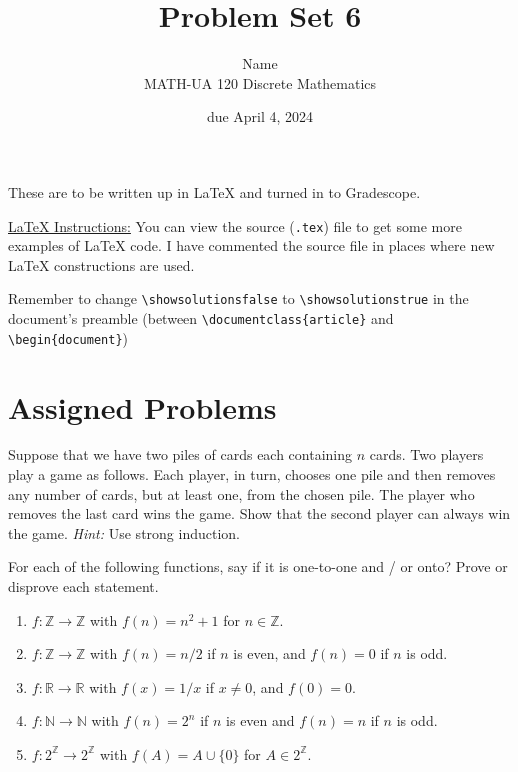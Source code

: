 \documentclass{article}
\title{Problem Set 6}
\author{%
    Name
\\  MATH-UA 120 Discrete Mathematics
}
\date{due April 4, 2024}
\newif\ifshowsolutions
\newcommand{\danger}{\marginpar[\hfill\dbend]{\dbend\hfill}}
\newcommand{\Z}{\mathbb{Z}}
\newcommand{\N}{\mathbb{N}}
\newcommand{\R}{\mathbb{R}}
\theoremstyle{definition}
\begin{document}
\maketitle



These are to be written up in \LaTeX{} and turned in to Gradescope.



\ifshowsolutions
    \SetupExSheets{solution/print=true}
\else
    \danger
 \underline{ \LaTeX{}  Instructions:}  You can view the source (\texttt{.tex}) file to get some more examples of \LaTeX{} code.  I have commented the source file in places where new \LaTeX{} constructions are used.
  
  Remember to change \verb|\showsolutionsfalse| to \verb|\showsolutionstrue|
    in the document's preamble 
    (between \verb|\documentclass{article}| and \verb|\begin{document}|)
\fi

\section*{Assigned Problems}


\begin{question}{9}
    Suppose that we have two piles of cards each containing \(n\) cards. Two players play a game as follows. Each player, in turn, chooses one pile and then removes any number of cards, but at least one, from the chosen pile. The player who removes the last card wins the game. Show that the second player can always win the game. \textit{Hint:} Use strong induction.
\end{question}
\begin{solution}
\end{solution}


\begin{question}{10}
    For each of the following functions, say if it is one-to-one and / or onto? Prove or disprove each statement.
    \begin{enumerate}
	\item \(f \colon  \Z \to \Z\) with \(f(n) = n^2 + 1\) for \(n \in \Z\).
	\item \(f \colon  \Z \to \Z\) with \(f(n) = n/2\) if \(n\) is even, and \(f(n) = 0\) if \(n\) is odd.
	\item \(f \colon  \R \to \R\) with \(f(x) = 1/x\) if \(x \neq 0\), and \(f(0) = 0\).
	\item \(f\colon \N \to \N\) with \(f(n) = 2^n\) if \(n\) is even and \(f(n) = n\) if \(n\) is odd.
	\item \(f \colon  2^{\Z} \to 2^{\Z}\) with \(f(A) = A \cup \{ 0 \}\) for \(A \in 2^{\Z}\).
    \end{enumerate}
\end{question}
\begin{solution}
\end{solution}
\end{document}
